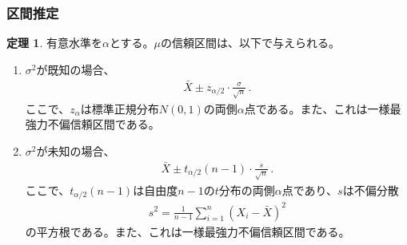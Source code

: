 \documentclass[11pt]{ltjsarticle}
\theoremstyle{definition}
\newtheorem{theorem}{定理}[section]
\begin{document}
\subsubsection{区間推定}
\begin{theorem}
    有意水準を$\alpha$とする。$\mu$の信頼区間は、以下で与えられる。
    \begin{enumerate}[(1)]
        \item $\sigma^2$が既知の場合、
        \begin{align}
            \bar{X} \pm z_{\alpha/2}\cdot\frac{\sigma}{\sqrt{n}}\,.
        \end{align}
        ここで、$z_{\alpha}$は標準正規分布$N(0, 1)$の両側$\alpha$点である。また、これは一様最強力不偏信頼区間である。

        \item $\sigma^2$が未知の場合、
        \begin{align}
            \bar{X} \pm t_{\alpha/2}(n-1)\cdot\frac{s}{\sqrt{n}}\,.
        \end{align}
        ここで、$t_{\alpha/2}(n-1)$は自由度$n-1$の$t$分布の両側$\alpha$点であり、$s$は不偏分散
        \begin{align}\label{sqrtubs}
            s^2 = \frac{1}{n-1}\sum_{i=1}^n(X_i-\bar{X})^2
        \end{align}
        の平方根である。また、これは一様最強力不偏信頼区間である。
    \end{enumerate}
\end{theorem}
\end{document}
